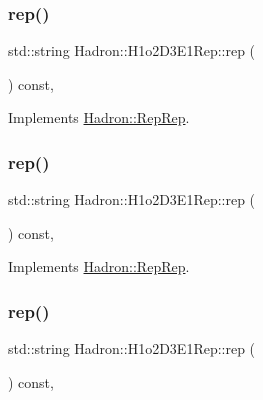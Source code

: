 \subsubsection{\texorpdfstring{rep()}{rep()}\hspace{0.1cm}{\footnotesize\ttfamily [1/3]}}
{\footnotesize\ttfamily std\+::string Hadron\+::\+H1o2\+D3\+E1\+Rep\+::rep (\begin{DoxyParamCaption}{ }\end{DoxyParamCaption}) const\hspace{0.3cm}{\ttfamily [inline]}, {\ttfamily [virtual]}}



Implements \mbox{\hyperlink{structHadron_1_1RepRep_ab3213025f6de249f7095892109575fde}{Hadron\+::\+Rep\+Rep}}.

\mbox{\label{structHadron_1_1H1o2D3E1Rep_a06bc9c58f069a4734422133269965d64}} 
\subsubsection{\texorpdfstring{rep()}{rep()}\hspace{0.1cm}{\footnotesize\ttfamily [2/3]}}
{\footnotesize\ttfamily std\+::string Hadron\+::\+H1o2\+D3\+E1\+Rep\+::rep (\begin{DoxyParamCaption}{ }\end{DoxyParamCaption}) const\hspace{0.3cm}{\ttfamily [inline]}, {\ttfamily [virtual]}}



Implements \mbox{\hyperlink{structHadron_1_1RepRep_ab3213025f6de249f7095892109575fde}{Hadron\+::\+Rep\+Rep}}.

\mbox{\label{structHadron_1_1H1o2D3E1Rep_a06bc9c58f069a4734422133269965d64}} 
\subsubsection{\texorpdfstring{rep()}{rep()}\hspace{0.1cm}{\footnotesize\ttfamily [3/3]}}
{\footnotesize\ttfamily std\+::string Hadron\+::\+H1o2\+D3\+E1\+Rep\+::rep (\begin{DoxyParamCaption}{ }\end{DoxyParamCaption}) const\hspace{0.3cm}{\ttfamily [inline]}, {\ttfamily [virtual]}}



